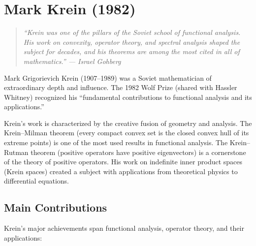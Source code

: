 \let\im\relax
\newcommand{\im}{\operatorname{im}}
\let\spn\relax
\newcommand{\spn}{\operatorname{span}}
\let\ess\relax
\newcommand{\ess}{\operatorname{ess}}
\let\Ran\relax
\newcommand{\Ran}{\operatorname{Ran}}
\let\Dom\relax
\newcommand{\Dom}{\operatorname{Dom}}
\let\Spec\relax
\newcommand{\Spec}{\operatorname{Spec}}
\let\N\relax
\newcommand{\N}{\mathbb{N}}
\let\R\relax
\newcommand{\R}{\mathbb{R}}
\let\C\relax
\newcommand{\C}{\mathbb{C}}
\let\Q\relax
\newcommand{\Q}{\mathbb{Q}}
\let\Z\relax
\newcommand{\Z}{\mathbb{Z}}
\let\cH\relax
\newcommand{\cH}{\mathcal{H}}
\let\cK\relax
\newcommand{\cK}{\mathcal{K}}
\let\cP\relax
\newcommand{\cP}{\mathcal{P}}

\chapter{Mark Krein (1982)}

\begin{quote}
\it ``Krein was one of the pillars of the Soviet school of functional analysis. His work on convexity, operator theory, and spectral analysis shaped the subject for decades, and his theorems are among the most cited in all of mathematics.'' --- Israel Gohberg
\end{quote}

Mark Grigorievich Krein (1907--1989) was a Soviet mathematician of extraordinary depth and influence. The 1982 Wolf Prize (shared with Hassler Whitney) recognized his ``fundamental contributions to functional analysis and its applications.''

Krein's work is characterized by the creative fusion of geometry and analysis. The Krein--Milman theorem (every compact convex set is the closed convex hull of its extreme points) is one of the most used results in functional analysis. The Krein--Rutman theorem (positive operators have positive eigenvectors) is a cornerstone of the theory of positive operators. His work on indefinite inner product spaces (Krein spaces) created a subject with applications from theoretical physics to differential equations.

\section{Main Contributions}

Krein's major achievements span functional analysis, operator theory, and their applications:

